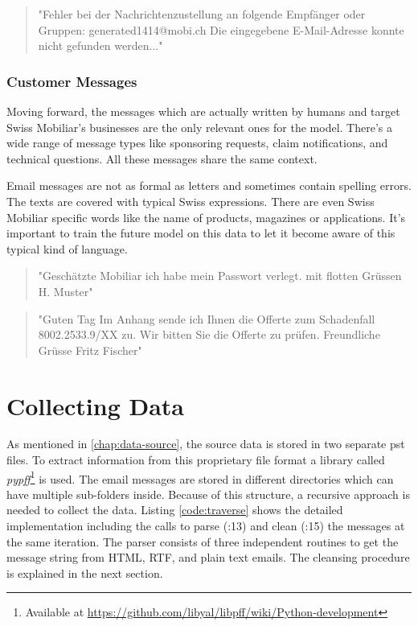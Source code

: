 \begin{quote}
    "Fehler bei der Nachrichtenzustellung an folgende Empfänger oder Gruppen: generated1414@mobi.ch Die eingegebene E-Mail-Adresse konnte nicht gefunden werden..."
\end{quote}

\subsubsection{Customer Messages}

Moving forward, the messages which are actually written by humans and target Swiss Mobiliar's businesses are the only relevant ones for the model. There's a wide range of message types like sponsoring requests, claim notifications, and technical questions. All these messages share the same context.

Email messages are not as formal as letters and sometimes contain spelling errors. The texts are covered with typical Swiss expressions. There are even Swiss Mobiliar specific words like the name of products, magazines or applications. It's important to train the future model on this data to let it become aware of this typical kind of language.

\begin{quote}
    "Geschätzte Mobiliar ich habe mein Passwort verlegt. mit flotten Grüssen H. Muster"
\end{quote}

\begin{quote}
    "Guten Tag Im Anhang sende ich Ihnen die Offerte zum Schadenfall 8002.2533.9/XX zu. Wir bitten Sie die Offerte zu prüfen. Freundliche Grüsse Fritz Fischer"
\end{quote}

\section{Collecting Data}

As mentioned in \ref{chap:data-source}, the source data is stored in two separate \acrshort{pst} files. To extract information from this proprietary file format a library called \emph{pypff}\footnote{Available at \url{https://github.com/libyal/libpff/wiki/Python-development}} is used. The email messages are stored in different directories which can have multiple sub-folders inside. Because of this structure, a recursive approach is needed to collect the data. Listing \ref{code:traverse} shows the detailed implementation including the calls to parse (:13) and clean (:15) the messages at the same iteration. The parser consists of three independent routines to get the message string from HTML, RTF, and plain text emails. The cleansing procedure is explained in the next section.

